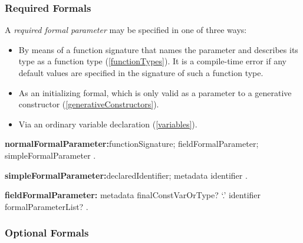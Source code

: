 \documentclass{article}
\begin{document}
\subsubsection{Required Formals}

\LMHash{}
A {\em required formal parameter} may be specified in one of three ways:
\begin{itemize}
\item By means of a function signature that names the parameter and describes its type as a function type (\ref{functionTypes}).  It is a compile-time error if any default values are specified in the signature of such a function type.%
\item As an initializing formal, which is only valid as a parameter to a generative constructor (\ref{generativeConstructors}). %
\item Via an ordinary variable declaration (\ref{variables}).
\end{itemize}

\begin{grammar}
{\bf normalFormalParameter:}functionSignature;
      fieldFormalParameter;
      simpleFormalParameter
 .

{\bf simpleFormalParameter:}declaredIdentifier;
      metadata identifier
    .

{\bf fieldFormalParameter:}
   metadata finalConstVarOrType? \THIS{} `{\escapegrammar .}' identifier formalParameterList?
   .
\end{grammar}




\subsubsection{Optional Formals}
\end{document}
